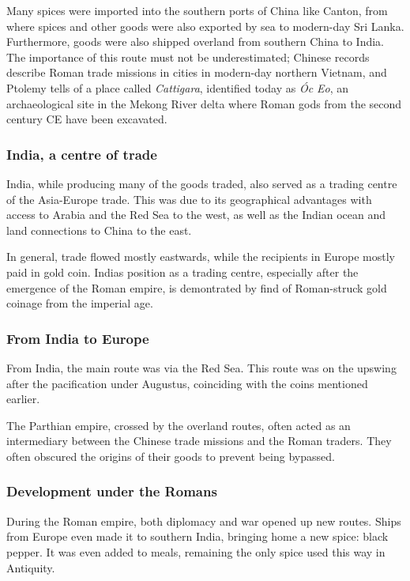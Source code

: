 \documentclass[11pt, a4paper, headings=standardclasses]{scrartcl}
\begin{document}
Many spices were imported into the southern ports of China like Canton, from where spices and other goods were also exported by sea to modern-day Sri Lanka. Furthermore, goods were also shipped overland from southern China to India.\autocite[Maps 4 and 5]{Rome} The importance of this route must not be underestimated; Chinese records describe Roman trade missions in cities in modern-day northern Vietnam\autocite{curtin_1984}, and Ptolemy tells of a place called \emph{Cattigara}, identified today as \emph{\'{O}c Eo}, an archaeological site in the Mekong River delta where Roman gods from the second century CE have been excavated.\autocite{OcEo}

\subsubsection{India, a centre of trade}
India, while producing many of the goods traded, also served as a trading centre of the Asia-Europe trade. This was due to its geographical advantages with access to Arabia and the Red Sea to the west, as well as the Indian ocean and land connections to China to the east.

In general, trade flowed mostly eastwards, while the recipients in Europe mostly paid in gold coin. Indias position as a trading centre, especially after the emergence of the Roman empire, is demontrated by find of Roman-struck gold coinage from the imperial age.\autocite[100]{curtin_1984}\label{gold}

\subsubsection{From India to Europe}

From India, the main route was via the Red Sea. This route was on the upswing after the pacification under Augustus, coinciding with the coins mentioned earlier.\autocite[Chapter 7]{Rome}

The Parthian empire, crossed by the overland routes, often acted as an intermediary between the Chinese trade missions and the Roman traders. They often obscured the origins of their goods to prevent being bypassed.\autocite{SilkRome}

\subsubsection{Development under the Romans}

During the Roman empire, both diplomacy and war opened up new routes. Ships from Europe even made it to southern India, bringing home a new spice: black pepper. It was even added to meals, remaining the only spice used this way in Antiquity.\autocite{RIS}
\end{document}
